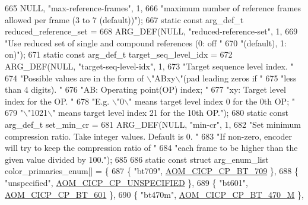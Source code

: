 \begin{DoxyCodeInclude}
{{{{{{{665     NULL, \textcolor{stringliteral}{"max-reference-frames"}, 1,
666     \textcolor{stringliteral}{"maximum number of reference frames allowed per frame (3 to 7 (default))"});
667 \textcolor{keyword}{static} \textcolor{keyword}{const} arg\_def\_t reduced\_reference\_set =
668     ARG\_DEF(NULL, \textcolor{stringliteral}{"reduced-reference-set"}, 1,
669             \textcolor{stringliteral}{"Use reduced set of single and compound references (0: off "}
670             \textcolor{stringliteral}{"(default), 1: on)"});
671 \textcolor{keyword}{static} \textcolor{keyword}{const} arg\_def\_t target\_seq\_level\_idx =
672     ARG\_DEF(NULL, \textcolor{stringliteral}{"target-seq-level-idx"}, 1,
673             \textcolor{stringliteral}{"Target sequence level index. "}
674             \textcolor{stringliteral}{"Possible values are in the form of \(\backslash\)"ABxy\(\backslash\)"(pad leading zeros if "}
675             \textcolor{stringliteral}{"less than 4 digits). "}
676             \textcolor{stringliteral}{"AB: Operating point(OP) index; "}
677             \textcolor{stringliteral}{"xy: Target level index for the OP. "}
678             \textcolor{stringliteral}{"E.g. \(\backslash\)"0\(\backslash\)" means target level index 0 for the 0th OP; "}
679             \textcolor{stringliteral}{"\(\backslash\)"1021\(\backslash\)" means target level index 21 for the 10th OP."});
680 \textcolor{keyword}{static} \textcolor{keyword}{const} arg\_def\_t set\_min\_cr =
681     ARG\_DEF(NULL, \textcolor{stringliteral}{"min-cr"}, 1,
682             \textcolor{stringliteral}{"Set minimum compression ratio. Take integer values. Default is 0. "}
683             \textcolor{stringliteral}{"If non-zero, encoder will try to keep the compression ratio of "}
684             \textcolor{stringliteral}{"each frame to be higher than the given value divided by 100."});
685 
686 \textcolor{keyword}{static} \textcolor{keyword}{const} \textcolor{keyword}{struct }arg\_enum\_list color\_primaries\_enum[] = \{
687   \{ \textcolor{stringliteral}{"bt709"}, \hyperlink{aom__image_8h_a5267ad095a088ece3499336812503cefa9a2ebe055c0508a2a2f72b6c192fcce9}{AOM\_CICP\_CP\_BT\_709} \},
688   \{ \textcolor{stringliteral}{"unspecified"}, \hyperlink{aom__image_8h_a5267ad095a088ece3499336812503cefa0835a3af8e6ffc6df298b6e64f878431}{AOM\_CICP\_CP\_UNSPECIFIED} \},
689   \{ \textcolor{stringliteral}{"bt601"}, \hyperlink{aom__image_8h_a5267ad095a088ece3499336812503cefa3ce81eb125550ec2f11a58f183eeaee6}{AOM\_CICP\_CP\_BT\_601} \},
690   \{ \textcolor{stringliteral}{"bt470m"}, \hyperlink{aom__image_8h_a5267ad095a088ece3499336812503cefa5b57cb26f04f4df6585335129392d5e2}{AOM\_CICP\_CP\_BT\_470\_M} \},
}}}}}}}
\end{DoxyCodeInclude}
